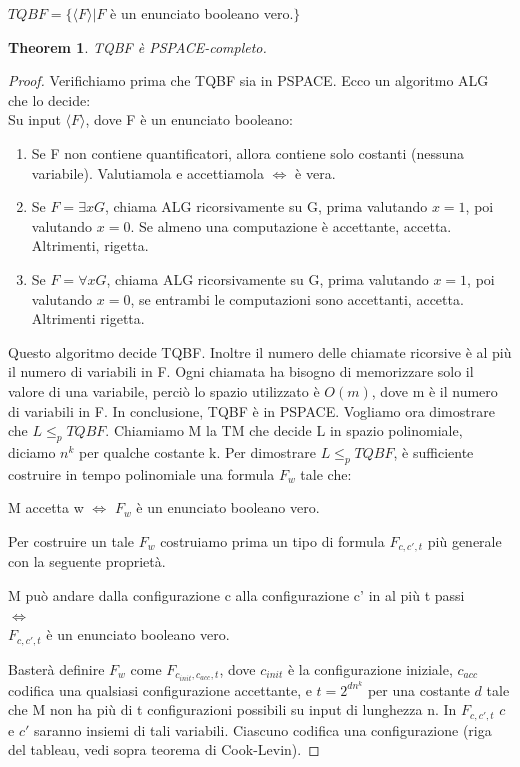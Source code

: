 \documentclass[a4paper, 12pt]{article}
\newtheorem{theorem}{Theorem}[section]
\begin{document}
\begin{center}
$TQBF = \{\langle F \rangle | F$ \`e un enunciato booleano vero.$ \}$
\end{center}
\begin{theorem}
TQBF \`e PSPACE-completo.
\end{theorem}
\begin{proof}
Verifichiamo prima che TQBF sia in PSPACE. Ecco un algoritmo ALG che lo decide:\\
Su input $\langle F \rangle$, dove F \`e un enunciato booleano:
\begin{enumerate}
\item Se F non contiene quantificatori, allora contiene solo costanti (nessuna variabile). Valutiamola e accettiamola $\iff$ \`e vera.
\item Se $F = \exists x G$, chiama ALG ricorsivamente su G, prima valutando $x = 1$, poi valutando $x = 0$. Se almeno una computazione \`e accettante, accetta. Altrimenti, rigetta.
\item Se $F = \forall x G$, chiama ALG ricorsivamente su G, prima valutando $x = 1$, poi valutando $x = 0$, se entrambi le computazioni sono accettanti, accetta. Altrimenti rigetta.
\end{enumerate}
Questo algoritmo decide TQBF. Inoltre il numero delle chiamate ricorsive \`e al pi\`u il numero di variabili in F. Ogni chiamata ha bisogno di memorizzare solo il valore di una variabile, perci\`o lo spazio utilizzato \`e $O(m)$, dove m \`e il numero di variabili in F. In conclusione, TQBF \`e in PSPACE. Vogliamo ora dimostrare che $L \leq_p TQBF$. Chiamiamo M la TM che decide L in spazio polinomiale, diciamo $n^k$ per qualche costante k. Per dimostrare $L \leq_p TQBF$, \`e sufficiente costruire in tempo polinomiale una formula $F_w$ tale che:
\begin{center}
M accetta w $\iff$ $F_w$ \`e un enunciato booleano vero.
\end{center}
Per costruire un tale $F_w$ costruiamo prima un tipo di formula $F_{c,c',t}$ pi\`u generale con la seguente propriet\`a.
\begin{center}
M pu\`o andare dalla configurazione c alla configurazione c' in al pi\`u t passi  \\$\iff$ \\ $F_{c,c',t}$ \`e un enunciato booleano vero.
\end{center}
Baster\`a definire $F_w$ come $F_{c_{init},c_{acc},t}$, dove $c_{init}$ \`e la configurazione iniziale, $c_{acc}$ codifica una qualsiasi configurazione accettante, e $t = 2^{dn^k}$ per una costante $d$ tale che M non ha pi\`u di t configurazioni possibili su input di lunghezza n. In $F_{c,c',t}$ $c$ e $c'$ saranno insiemi di tali variabili. Ciascuno codifica una configurazione (riga del tableau, vedi sopra teorema di Cook-Levin).

\end{proof}
\end{document}
